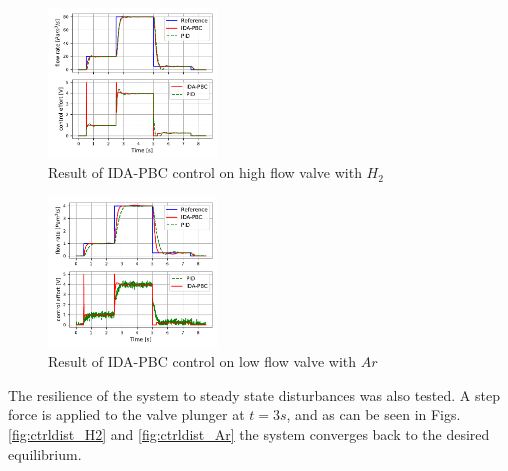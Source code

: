 \documentclass[letterpaper, 10pt, conference]{ieeeconf}
\begin{document}
\begin{figure}[!ht]
    \centering
    \includegraphics[width=0.4\textwidth]{flow_steps_H2.pdf}
    \caption{Result of IDA-PBC control on high flow valve with $H_2$}
    \label{fig:ctrlsteps_H2}
\end{figure}
\begin{figure}[!ht]
    \centering
    \includegraphics[width=0.4\textwidth]{flow_steps_Ar.pdf}
    \caption{Result of IDA-PBC control on low flow valve with $Ar$}
    \label{fig:ctrlsteps_Ar}
\end{figure}


The resilience of the system to steady state disturbances was also tested. A step force is applied to the valve plunger at $t=3s$, and as can be seen in Figs. \ref{fig:ctrldist_H2} and \ref{fig:ctrldist_Ar} the system converges back to the desired equilibrium.
\end{document}
